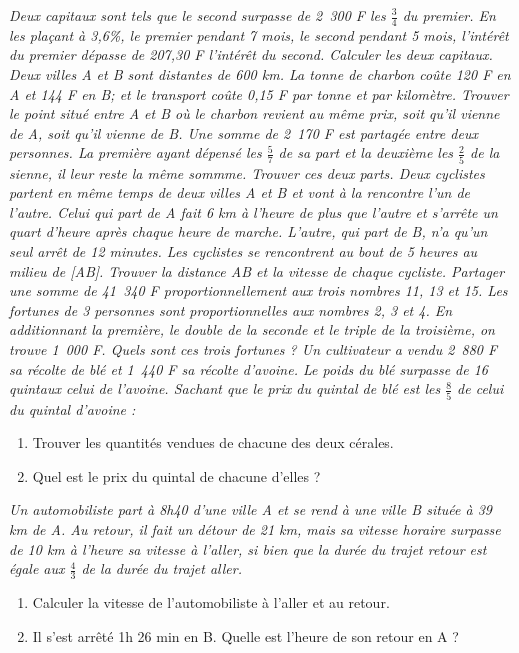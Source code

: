 \begin{itemize}
\it Deux capitaux sont tels que le second surpasse de 2~300 F les $\frac34$ du premier. En les plaçant à 3,6\%, le premier pendant 7 mois, le second pendant 5 mois, l'intérêt du premier dépasse de 207,30 F l'intérêt du second. Calculer les deux capitaux. 
\it Deux villes A et B sont distantes de 600 km. La tonne de charbon coûte 120 F en A et 144 F en B; et le transport coûte 0,15 F par tonne et par kilomètre. Trouver le point situé entre A et B où le charbon revient au même prix, soit qu'il vienne de A, soit qu'il vienne de B. 
\it Une somme de 2~170 F est partagée entre deux personnes. La première ayant dépensé les $\frac57$ de sa part et la deuxième les $\frac25$ de la sienne, il leur reste la même sommme. Trouver ces deux parts. 
\it Deux cyclistes partent en même temps de deux villes A et B et vont à la rencontre l'un de l'autre. Celui qui part de A fait 6 km à l'heure de plus que l'autre et s'arrête un quart d'heure après chaque heure de marche. L'autre, qui part de B, n'a qu'un seul arrêt de 12 minutes. Les cyclistes se rencontrent au bout de 5 heures au milieu de [AB]. Trouver la distance AB et la vitesse de chaque cycliste. 
\it Partager une somme de 41~340 F proportionnellement aux trois nombres 11, 13 et 15. 
\it Les fortunes de 3 personnes sont proportionnelles aux nombres 2, 3 et 4. En additionnant la première, le double de la seconde et le triple de la troisième, on trouve 1~000 F. Quels sont ces trois fortunes ? 
\it Un cultivateur a vendu 2~880 F sa récolte de blé et 1~440 F sa récolte d'avoine. Le poids du blé surpasse de 16 quintaux celui de l'avoine. Sachant que le prix du quintal de blé est les $\frac85$ de celui du quintal d'avoine : 
\begin{enumerate}
\item Trouver les quantités vendues de chacune des deux cérales. 
\item Quel est le prix du quintal de chacune d'elles ?
\end{enumerate}
\it Un automobiliste part à 8h40 d'une ville A et se rend à une ville B située à 39 km de A. Au retour, il fait un détour de 21 km, mais sa vitesse horaire surpasse de 10 km à l'heure sa vitesse à l'aller, si bien que la durée du trajet retour est égale aux $\frac43$ de la durée du trajet aller.\begin{enumerate}
\item Calculer la vitesse de l'automobiliste à l'aller et au retour.
\item Il s'est arrêté 1h 26 min en B. Quelle est l'heure de son retour en A ? 
\end{enumerate}

\end{itemize}
